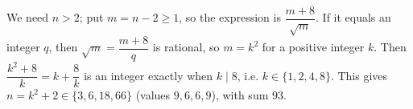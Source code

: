 We need $n>2$; put $m=n-2\ge1$, so the expression is $\dfrac{m+8}{\sqrt m}$. If it equals an integer $q$, then $\sqrt m=\dfrac{m+8}{q}$ is rational, so $m=k^2$ for a positive integer $k$. Then $\dfrac{k^2+8}{k}=k+\dfrac8k$ is an integer exactly when $k\mid8$, i.e. $k\in\{1,2,4,8\}$. This gives $n=k^2+2\in\{3,6,18,66\}$ (values $9,6,6,9$), with sum $\boxed{93}$.
